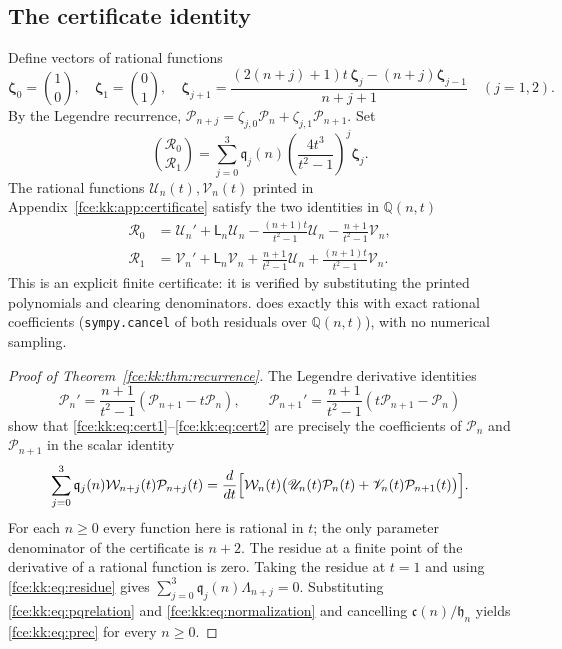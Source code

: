 \documentclass[11pt,a4paper]{article}
\numberwithin{equation}{section}
\theoremstyle{definition}\newtheorem{definition}[theorem]{Definition}
\theoremstyle{remark}\newtheorem{remark}[theorem]{Remark}
\newcommand{\Q}{\mathbb Q}
\begin{document}
\subsection{The certificate identity}
Define vectors of rational functions
\[
 \boldsymbol\zeta_0=\binom10,\quad \boldsymbol\zeta_1=\binom01,\quad
 \boldsymbol\zeta_{j+1}=\frac{(2(n+j)+1)t\,\boldsymbol\zeta_j-(n+j)\boldsymbol\zeta_{j-1}}{n+j+1}
 \quad(j=1,2).
\]
By the Legendre recurrence,
$\mathcal P_{n+j}=\zeta_{j,0}\mathcal P_n+\zeta_{j,1}\mathcal P_{n+1}$. Set
\begin{equation}\label{fce:kk:eq:Rvector}
 \binom{\mathscr R_0}{\mathscr R_1}
 =\sum_{j=0}^3\mathfrak q_j(n)\left(\frac{4t^3}{t^2-1}\right)^j\boldsymbol\zeta_j .
\end{equation}
The rational functions $\mathscr U_n(t),\mathscr V_n(t)$ printed in
Appendix~\ref{fce:kk:app:certificate} satisfy the two identities in
$\Q(n,t)$
\begin{align}
 \mathscr R_0&=\mathscr U_n'+\mathsf L_n\mathscr U_n
       -\frac{(n+1)t}{t^2-1}\mathscr U_n-\frac{n+1}{t^2-1}\mathscr V_n,
       \label{fce:kk:eq:cert1}\\
 \mathscr R_1&=\mathscr V_n'+\mathsf L_n\mathscr V_n
       +\frac{n+1}{t^2-1}\mathscr U_n+\frac{(n+1)t}{t^2-1}\mathscr V_n .
       \label{fce:kk:eq:cert2}
\end{align}
This is an explicit finite certificate: it is verified by substituting the
printed polynomials and clearing denominators.
 does exactly this with exact
rational coefficients (\texttt{sympy.cancel} of both residuals over
$\Q(n,t)$), with no numerical sampling.

\begin{proof}[Proof of Theorem~\ref{fce:kk:thm:recurrence}]
The Legendre derivative identities
\[
 \mathcal P_n'=\frac{n+1}{t^2-1}(\mathcal P_{n+1}-t\mathcal P_n),\qquad
 \mathcal P_{n+1}'=\frac{n+1}{t^2-1}(t\mathcal P_{n+1}-\mathcal P_n)
\]
show that \eqref{fce:kk:eq:cert1}--\eqref{fce:kk:eq:cert2} are precisely
the coefficients of $\mathcal P_n$ and $\mathcal P_{n+1}$ in the scalar
identity
\begin{equation}\label{fce:kk:eq:telescoper}
 \sum_{j=0}^3\mathfrak q_j(n)\mathcal W_{n+j}(t)\mathcal P_{n+j}(t)
 =\frac{d}{dt}\Bigl[\mathcal W_n(t)
       \bigl(\mathscr U_n(t)\mathcal P_n(t)+\mathscr V_n(t)\mathcal P_{n+1}(t)\bigr)\Bigr].
\end{equation}
For each $n\ge0$ every function here is rational in $t$; the only
parameter denominator of the certificate is $n+2$. The residue at a finite
point of the derivative of a rational function is zero. Taking the residue
at $t=1$ and using \eqref{fce:kk:eq:residue} gives
$\sum_{j=0}^3\mathfrak q_j(n)\Lambda_{n+j}=0$. Substituting
\eqref{fce:kk:eq:pqrelation} and \eqref{fce:kk:eq:normalization} and
cancelling $\mathfrak c(n)/\mathfrak h_n$ yields \eqref{fce:kk:eq:prec} for
every $n\ge0$.
\end{proof}
\end{document}
